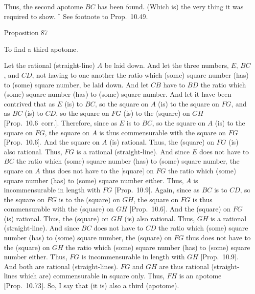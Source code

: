 Thus, the second apotome $BC$ has been found. (Which is) the very thing
it was required to show.
{\footnotesize\noindent$^\dag$ See footnote to Prop.~10.49.}


\begin{center}
{\large Proposition 87}
\end{center}

To find a third apotome.

\centerline{}

Let the rational (straight-line) $A$ be laid down. And let the
three numbers, $E$, $BC$, and $CD$, not having to one another
the ratio which (some) square number (has) to (some) square number,
be laid down. And let $CB$ have to $BD$ the ratio which (some)
square number (has) to (some) square number. And let it have been
contrived that as $E$ (is) to $BC$, so the square on $A$ (is) to the square
on $FG$, and as $BC$ (is) to $CD$, so the square on $FG$ (is) to the (square)
on $GH$ [Prop.~10.6~corr.]. Therefore,
since  as $E$ is to $BC$, so the square on $A$ (is) to the square on
$FG$, the square on $A$ is thus commensurable with the square on
$FG$ [Prop.~10.6]. And the square on $A$
(is) rational. Thus, the (square) on $FG$ (is) also rational. Thus,
$FG$ is a rational (straight-line). And since  $E$ does not have to $BC$
the ratio which (some) square number (has) to (some) square number,
the square on $A$ thus does not have to the [square] on $FG$ the ratio
which (some) square number (has) to (some) square number either. Thus,
$A$ is incommensurable in length with $FG$ [Prop.~10.9]. Again, since as $BC$ is to $CD$, so
the square on $FG$ is to the (square) on $GH$, the square on $FG$
is thus commensurable with the (square) on $GH$ [Prop.~10.6]. And the (square) on $FG$ (is)
rational. Thus, the (square) on $GH$ (is) also rational. Thus, $GH$ is
a rational (straight-line). And since $BC$ does not have to $CD$ the
ratio which (some) square number (has) to (some) square number, the
(square) on $FG$ thus does not have to the (square) on $GH$ the
ratio which (some) square number (has) to (some) square number either.
Thus, $FG$ is incommensurable in length with $GH$ [Prop.~10.9]. And both are rational (straight-lines).
$FG$ and $GH$ are thus rational (straight-lines which are) commensurable
in square only. Thus, $FH$ is an apotome [Prop.~10.73]. So, I say that (it is) also a third
(apotome).

